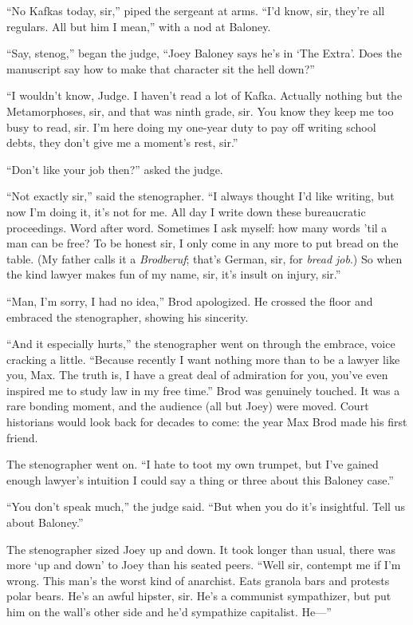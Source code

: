 \documentclass[oneside]{book}
\begin{document}
``No Kafkas today, sir,'' piped the sergeant at arms.  ``I'd know, sir, they're all regulars.
All but him I mean,'' with a nod at Baloney.

``Say, stenog,'' began the judge, ``Joey Baloney says he's in `The Extra'.  Does the manuscript
say how to make that character sit the hell down?''

``I wouldn't know, Judge.  I haven't read a lot of Kafka.  Actually nothing but the Metamorphoses, sir,
and that was ninth grade, sir.  You know they keep me too busy to read, sir.  I'm here doing my one-year
duty to pay off writing school debts, they don't give me a moment's rest, sir.''

``Don't like your job then?'' asked the judge.

``Not exactly sir,'' said the stenographer.
``I always thought I'd like writing, but now I'm doing it,
it's not for me.  All day I write down these bureaucratic proceedings.  Word after word.
Sometimes I ask myself: how many words 'til a man can be free?
To be honest sir, I only
come in any more to put bread on the table.  (My father calls it a \emph{Brodberuf}; that's
German, sir, for \emph{bread job}.)
So when the kind lawyer makes fun of my name, sir, it's insult on
injury, sir.''

``Man, I'm sorry, I had no idea,'' Brod apologized.  He crossed the floor and embraced the stenographer,
showing his sincerity.

``And it especially hurts,'' the stenographer went on through the embrace, voice cracking a little.
``Because recently I want nothing more
than to be a lawyer like you, Max.  The truth is, I have a great deal of admiration
for you, you've even inspired me to study law in my free time.''
Brod was genuinely touched.  It was a rare bonding moment, and the audience (all but Joey)
were moved.  Court historians would look back
for decades to come: the year Max Brod made his first friend.

The stenographer went on.  ``I hate to toot my own trumpet, but I've gained enough
lawyer's intuition I could say a thing or three about this Baloney case.''

``You don't speak much,'' the judge said.  ``But when you do it's
insightful.  Tell us about Baloney.''

The stenographer sized Joey up and down.  It took longer
than usual, there was more `up and down' to Joey than his seated peers.
``Well sir, contempt me if I'm wrong.  This man's the worst kind of anarchist.
Eats granola bars and protests polar bears.  He's an awful hipster, sir.
He's a communist sympathizer, but put him on the wall's other side and he'd sympathize
capitalist.  He---''
\end{document}
